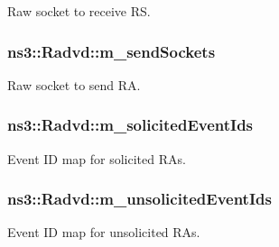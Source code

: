 Raw socket to receive RS. 

\subsubsection[{\texorpdfstring{m\+\_\+send\+Sockets}{m_sendSockets}}]{ ns3\+::\+Radvd\+::m\+\_\+send\+Sockets\hspace{0.3cm}{\ttfamily [private]}}\hypertarget{classns3_1_1Radvd_ab0bd7a7d72f1ec0909ec447bcdf4788e}{}\label{classns3_1_1Radvd_ab0bd7a7d72f1ec0909ec447bcdf4788e}


Raw socket to send RA. 

\subsubsection[{\texorpdfstring{m\+\_\+solicited\+Event\+Ids}{m_solicitedEventIds}}]{ ns3\+::\+Radvd\+::m\+\_\+solicited\+Event\+Ids\hspace{0.3cm}{\ttfamily [private]}}\hypertarget{classns3_1_1Radvd_a135124427566b60ccc12b6b93e708484}{}\label{classns3_1_1Radvd_a135124427566b60ccc12b6b93e708484}


Event ID map for solicited R\+As. 

\subsubsection[{\texorpdfstring{m\+\_\+unsolicited\+Event\+Ids}{m_unsolicitedEventIds}}]{ ns3\+::\+Radvd\+::m\+\_\+unsolicited\+Event\+Ids\hspace{0.3cm}{\ttfamily [private]}}\hypertarget{classns3_1_1Radvd_aa214a58cd8ed1b693a177e9611b88177}{}\label{classns3_1_1Radvd_aa214a58cd8ed1b693a177e9611b88177}


Event ID map for unsolicited R\+As. 

